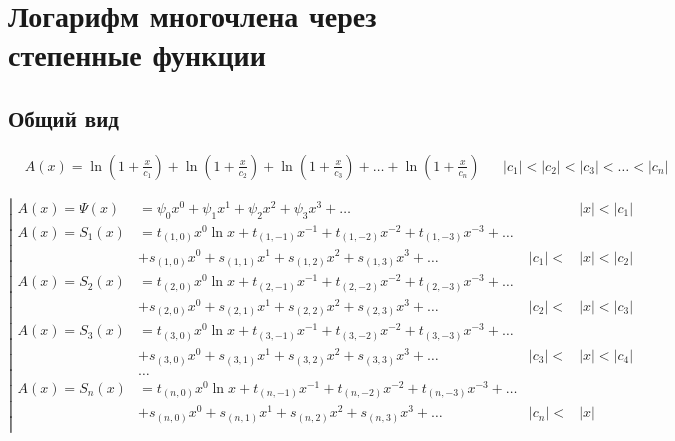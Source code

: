 
\section{Логарифм многочлена через степенные функции}

\subsection{Общий вид}

\begin{equation*} \begin{aligned}
&A(x) =
  \ln{\left(1 + \frac{x}{c_1} \right)}
+ \ln{\left(1 + \frac{x}{c_2} \right)}
+ \ln{\left(1 + \frac{x}{c_3} \right)}
+ \ldots
+ \ln{\left(1 + \frac{x}{c_n} \right)} &
&|c_1| < |c_2| < |c_3| < \ldots < |c_n|
\end{aligned} \end{equation*}

\begin{equation*} \left| \begin{aligned}
A(x) = \Psi(x) &=
  \psi_0 x^0
+ \psi_1 x^1
+ \psi_2 x^2
+ \psi_3 x^3
+ \ldots &
&|x| < |c_1| \\
%
A(x) = S_1(x) &= 
  t_{(1,0)} x^0 \ln{x}
+ t_{(1,-1)} x^{-1}
+ t_{(1,-2)} x^{-2}
+ t_{(1,-3)} x^{-3}
+ \ldots \\ &
+ s_{(1,0)} x^0
+ s_{(1,1)} x^1
+ s_{(1,2)} x^2
+ s_{(1,3)} x^3
+ \ldots &
|c_1| < &|x| < |c_2| \\
%
A(x) = S_2(x) &= 
  t_{(2,0)} x^0 \ln{x}
+ t_{(2,-1)} x^{-1}
+ t_{(2,-2)} x^{-2}
+ t_{(2,-3)} x^{-3}
+ \ldots \\ &
+ s_{(2,0)} x^0
+ s_{(2,1)} x^1
+ s_{(2,2)} x^2
+ s_{(2,3)} x^3
+ \ldots &
|c_2| < &|x| < |c_3| \\
%
A(x) = S_3(x) &= 
  t_{(3,0)} x^0 \ln{x}
+ t_{(3,-1)} x^{-1}
+ t_{(3,-2)} x^{-2}
+ t_{(3,-3)} x^{-3}
+ \ldots \\ &
+ s_{(3,0)} x^0
+ s_{(3,1)} x^1
+ s_{(3,2)} x^2
+ s_{(3,3)} x^3
+ \ldots &
|c_3| < &|x| < |c_4| \\
%
&\ldots \\
%
A(x) = S_n(x) &= 
  t_{(n,0)} x^0 \ln{x}
+ t_{(n,-1)} x^{-1}
+ t_{(n,-2)} x^{-2}
+ t_{(n,-3)} x^{-3}
+ \ldots \\ &
+ s_{(n,0)} x^0
+ s_{(n,1)} x^1
+ s_{(n,2)} x^2
+ s_{(n,3)} x^3
+ \ldots &
|c_n| < &|x| \\
\end{aligned} \right. \end{equation*}

